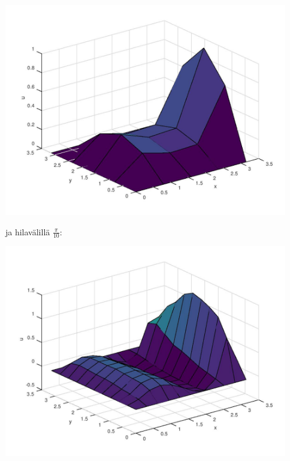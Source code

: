 \documentclass{article}
\begin{document}
\includegraphics[width=350pt]{w3_3-4p.jpg}

ja hilavälillä $\frac{\pi}{10}$:

\includegraphics[width=350pt]{w3_3-10p.jpg}
\end{document}
